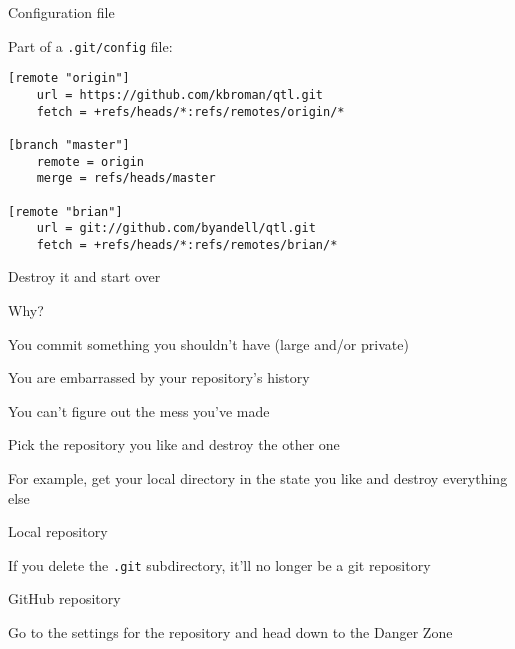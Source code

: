\documentclass[aspectratio=169,12pt,t]{beamer}
\begin{document}
\begin{frame}[fragile]{Configuration file}

\vspace{24pt}

Part of a {\tt .git/config} file:

\begin{lstlisting}
[remote "origin"]
    url = https://github.com/kbroman/qtl.git
    fetch = +refs/heads/*:refs/remotes/origin/*

[branch "master"]
    remote = origin
    merge = refs/heads/master

[remote "brian"]
    url = git://github.com/byandell/qtl.git
    fetch = +refs/heads/*:refs/remotes/brian/*
\end{lstlisting}

\end{frame}


\begin{frame}{Destroy it and start over}

  \bbi
\item Why?
  \bi
\item You commit something you shouldn't have (large and/or private)
\item You are embarrassed by your repository's history
\item You can't figure out the mess you've made
  \ei

\item Pick the repository you like and destroy the other one
  \bi
\item For example, get your local directory in the state you like and destroy
  everything else
  \ei

\item Local repository
  \bi
  \item If you delete the {\tt .git} subdirectory, it'll
    no longer be a git repository
    \ei

\item GitHub repository
  \bi
  \item Go to the settings for the repository and head down to
  the Danger Zone
  \ei

  \ei

\end{frame}
\end{document}
